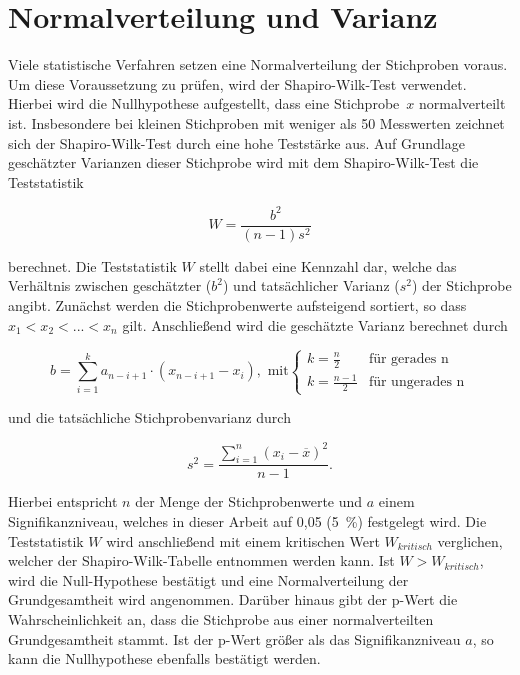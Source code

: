 \section{Normalverteilung und Varianz}

Viele statistische Verfahren setzen eine Normalverteilung der Stichproben voraus. Um diese Voraussetzung zu prüfen, wird der Shapiro-Wilk-Test verwendet. Hierbei wird die Nullhypothese aufgestellt, dass eine Stichprobe~$x$ normalverteilt ist. Insbesondere bei kleinen Stichproben mit weniger als 50 Messwerten zeichnet sich der Shapiro-Wilk-Test durch eine hohe Teststärke aus. Auf Grundlage geschätzter Varianzen dieser Stichprobe wird mit dem Shapiro-Wilk-Test die Teststatistik

\begin{equation}
W =  \frac{b^2}{(n - 1)s^2}
	\label{eq:shapiro}
\end{equation}

berechnet. Die Teststatistik $W$ stellt dabei eine Kennzahl dar, welche das Verhältnis zwischen geschätzter ($b^2$) und tatsächlicher Varianz ($s^2$) der Stichprobe angibt. Zunächst werden die Stichprobenwerte aufsteigend sortiert, so dass $x_1 < x_2 < ... < x_n$ gilt. Anschließend wird die geschätzte Varianz berechnet durch

\begin{equation}
b =  \sum \limits_{i=1}^k a_{n-i+1} \cdot (x_{n-i+1} - x_i), \text{ mit} \begin{cases}
     k = \frac{n}{2} & \text{für gerades n}\\
     k = \frac{n-1}{2} & \text{für ungerades n}
   \end{cases}
	\label{eq:var1}
\end{equation}

und die tatsächliche Stichprobenvarianz durch 

\begin{equation}
s^2 = \frac{\sum \limits_{i=1}^n (x_i - \overline{x})^2}{n - 1}.
	\label{eq:var1}
\end{equation}

Hierbei entspricht $n$ der Menge der Stichprobenwerte und $a$ einem Signifikanzniveau, welches in dieser Arbeit auf 0,05 (5~\%) festgelegt wird. Die Teststatistik $W$ wird anschließend mit einem kritischen Wert $W_{kritisch}$ verglichen, welcher der Shapiro-Wilk-Tabelle entnommen werden kann. Ist $W > W_{kritisch}$, wird die Null-Hypothese bestätigt und eine Normalverteilung der Grundgesamtheit wird angenommen. Darüber hinaus gibt der p-Wert die Wahrscheinlichkeit an, dass die Stichprobe aus einer normalverteilten Grundgesamtheit stammt. Ist der p-Wert größer als das Signifikanzniveau $a$, so kann die Nullhypothese ebenfalls bestätigt werden. \parencite{frank_einfach_2006, shapiro_analysis_1965}\\

